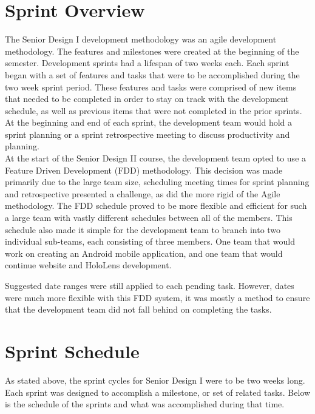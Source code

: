 \section{Sprint  Overview}\label{sec:SprintOverview}
The Senior Design I development methodology was an agile development methodology.
The features and milestones were created at the beginning of the semester.
Development sprints had a lifespan of two weeks each.
Each sprint began with a set of features and tasks that were to be accomplished during the two week sprint period.
These features and tasks were comprised of new items that needed to be completed in order to stay on track with the development schedule, as well as previous items that were not completed in the prior sprints.
At the beginning and end of each sprint, the development team would hold a sprint planning or a sprint retrospective meeting to discuss productivity and planning.\\

At the start of the Senior Design II course, the development team opted to use a Feature Driven Development (FDD) methodology.  
This decision was made primarily due to the large team size, scheduling meeting times for sprint planning and retrospective presented a challenge, as did the more rigid of the Agile methodology. 
The FDD schedule proved to be more flexible and efficient for such a large team with vastly different schedules between all of the members.  
This schedule also made it simple for the development team to branch into two individual sub-teams, each consisting of three members.  
One team that would work on creating an Android mobile application, and one team that would continue website and HoloLens development.

Suggested date ranges were still applied to each pending task. However, dates were much more flexible with this FDD system, it was mostly a method to ensure that the development team did not fall behind on completing the tasks.


\section{Sprint Schedule}
As stated above, the sprint cycles for Senior Design I were to be two weeks long. Each sprint was designed to accomplish a milestone, or set of related tasks. Below is the schedule of the sprints and what was accomplished during that time.

